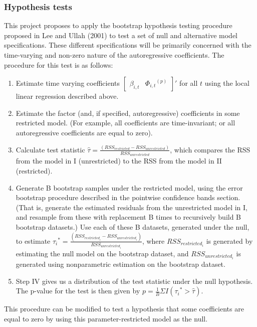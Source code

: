 \documentclass{article}
\begin{document}
\subsubsection{Hypothesis tests}
This project proposes to apply the bootstrap hypothesis testing procedure proposed in Lee and Ullah (2001) to test a set of null and alternative model specifications. These different specifications will be primarily concerned with the time-varying and non-zero nature of the autoregressive coefficients. The procedure for this test is as follows:
\renewcommand{\theenumi}{\Roman{enumi}}
\begin{enumerate}
	\item{Estimate time varying coefficients \({\begin{bmatrix}\beta_{i,t} &{\Phi_{i,t}}^{(p)}\end{bmatrix}}' \) for all \(t\) using the local linear regression described above.}
	\item{Estimate the factor (and, if specified, autoregressive) coefficients in some restricted model. (For example, all coefficients are time-invariant; or all autoregressive coefficients are equal to zero).}
	\item{Calculate test statistic \(\hat{\tau} = \frac{(RSS_{restricted} - RSS_{unrestricted})}{RSS_{unrestricted}}\), which compares the RSS from the model in I (unrestricted) to the RSS from the model in II (restricted).}
	\item{Generate B bootstrap samples under the restricted model, using the error bootstrap procedure described in the pointwise confidence bands section. (That is, generate the estimated residuals from the unrestricted model in I, and resample from these with replacement B times to recursively build B bootstrap datasets.) Use each of these B datasets, generated under the null, to estimate \({\tau_{i}}^{*} = \frac{(RSS_{restricted_{i}} - RSS_{unrestricted_{i}})}{RSS_{unrestricted_{i}}}\), where \(RSS_{restricted_{i}}\) is generated by estimating the null model on the bootstrap dataset, and \(RSS_{unrestricted_{i}}\) is generated using nonparametric estimation on the bootstrap dataset.}
	\item{Step IV gives us a distribution of the test statistic under the null hypothesis. The p-value for the test is then given by \( p = \frac{1}{B} \Sigma I({\tau_{i}}^{*} >  \hat{\tau}) \).}
\end{enumerate}
\noindent
This procedure can be modified to test a hypothesis that some coefficients are equal to zero by using this parameter-restricted model as the null.
\end{document}
